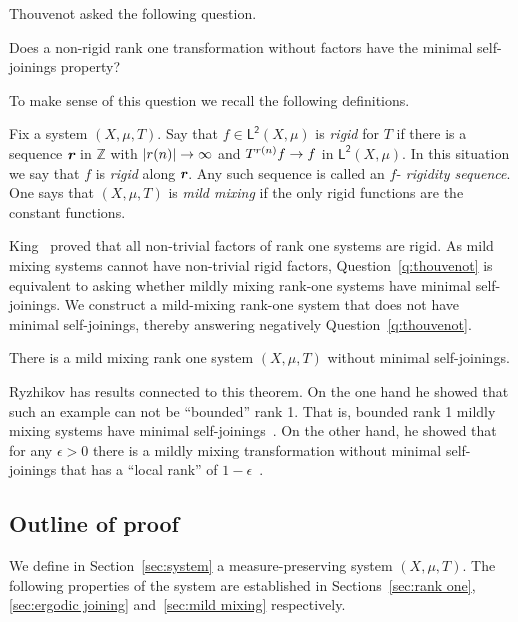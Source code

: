 \documentclass[AHL,Unicode,longabstracts,published]{cedram}
\newcommand{\Z}{\mathbb{Z}}
\newcommand{\lp}{\mathsf{L}}
\newcommand{\ltwo}{\lp^{\!\mathsf{2}}}
\def\mathbi#1{\textbf{\em #1}}
\newcommand{\bir}{\mathbi{r}}
\renewcommand*{\to}{\mathchoice{\longrightarrow}{\rightarrow}{\rightarrow}{\rightarrow}}
\begin{document}
Thouvenot asked the following question.

\begin{ques}[{\cite[\S~1.2 in Section~12]{MR4232241}}]\label{q:thouvenot}
Does a non-rigid rank one transformation without factors have the minimal self-joinings property?
\end{ques}

To make sense of this question we recall the following definitions.

\begin{defi}
Fix a system $(X,\mu,T)$. Say that $f \in \ltwo(X,\mu)$ is
\emph{rigid} for $T$ if there is a sequence $ \bir$ in $\Z$ with $|r(n)| \to \infty$ and $T^{r(n)} f \to f$ in $\ltwo(X,\mu)$. In this situation we say that $f$ is
\emph{rigid} along $\bir$. Any such sequence is called an $f$-
\emph{rigidity sequence}. One says that $(X,\mu,T)$ is
\emph{mild mixing} if the only rigid functions are the constant functions.
\end{defi}

King~\cite[p.~377]{MR0863200} proved that all non-trivial factors of rank one systems are rigid. As mild mixing systems cannot have non-trivial rigid factors, Question~\ref{q:thouvenot} is equivalent to asking whether mildly mixing rank-one systems have minimal self-joinings. We construct a mild-mixing rank-one system that does not have minimal self-joinings, thereby answering negatively Question~\ref{q:thouvenot}.

\begin{theo}\label{thm:main}
There is a mild mixing rank one system $(X,\mu,T)$ without minimal self-joinings.
\end{theo}

Ryzhikov has results connected to this theorem. On the one hand he showed that such an example can not be ``bounded'' rank 1. That is, bounded rank 1 mildly mixing systems have minimal self-joinings~\cite{MR3235793}. On the other hand, he showed that for any $\epsilon>0$ there is a mildly mixing transformation without minimal self-joinings that has a ``local rank'' of $1-\epsilon$~\cite{Ryzarx}.



\subsection{Outline of proof}

We define in Section~\ref{sec:system} a measure-preserving system $(X,\mu,T)$. The following properties of the system are established in Sections~\ref{sec:rank one}, \ref{sec:ergodic joining} and~\ref{sec:mild mixing} respectively.
\end{document}

